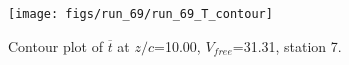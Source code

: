 \begin{figure}[H]
\centering
\texttt{[image: figs/run\_69/run\_69\_T\_contour]}
\caption{Contour plot of $\overline{t}$ at $z/c$=10.00, $V_{free}$=31.31, station 7.}
\label{fig:run_69_T_contour}
\end{figure}


